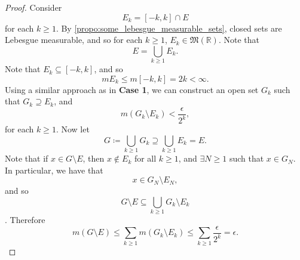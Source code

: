 \documentclass[notoc,notitlepage]{tufte-book}
\begin{document}
\begin{proof}
  \noindent
   Consider
  \begin{equation*}
    E_k = [-k, k] \cap E
  \end{equation*}
  for each $k \geq 1$.  By
  \cref{propo:some_lebesgue_measurable_sets}, closed sets are Lebesgue
  measurable, and so for each $k \geq 1$, $E_k \in \mathfrak{M}(\mathbb{R})$.
  Note that
  \begin{equation*}
    E = \bigcup_{k \geq 1} E_k.
  \end{equation*}
   Note that $E_k \subseteq [-k, k]$,
  and so
  \begin{equation*}
    m E_k \leq m [-k, k] = 2k < \infty.
  \end{equation*}
  Using a similar approach as in \textbf{Case 1}, we can construct an open set
  $G_k$ such that $G_k \supseteq E_k$, and
  \begin{equation*}
    m (G_k \setminus E_k) < \frac{\epsilon}{2^k},
  \end{equation*}
  for each $k \geq 1$. Now let
  \begin{equation*}
    G \coloneqq \bigcup_{k \geq 1} G_k \supseteq \bigcup_{k \geq 1} E_k = E.
  \end{equation*}
  Note that if $x \in G \setminus E$, then $x \notin E_k$ for all $k \geq 1$,
  and $\exists N \geq 1$ such that $x \in G_N$. In particular, we have that
  \begin{equation*}
    x \in G_N \setminus E_N,
  \end{equation*}
  and so
  \begin{equation*}
    G \setminus E \subseteq \bigcup_{k \geq 1} G_k \setminus E_k
  \end{equation*}
  . Therefore
  \begin{equation*}
    m (G \setminus E) \leq \sum_{k \geq 1} m(G_k \setminus E_k) \leq \sum_{k
    \geq 1} \frac{\epsilon}{2^k} = \epsilon.
  \end{equation*}


\end{proof}
\end{document}

